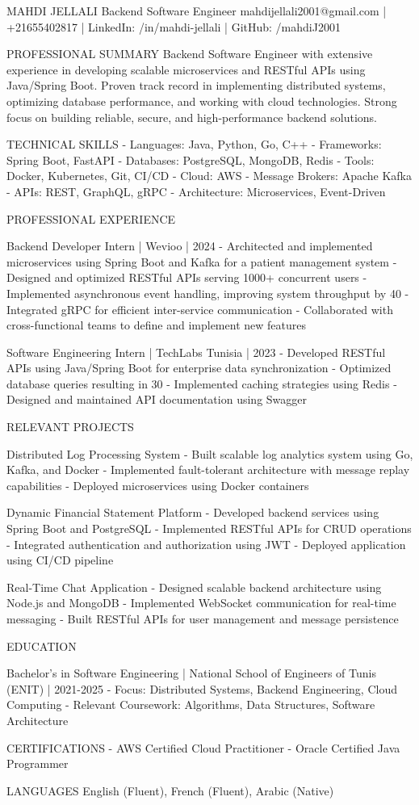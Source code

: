 MAHDI JELLALI
Backend Software Engineer
mahdijellali2001@gmail.com | +21655402817 | LinkedIn: /in/mahdi-jellali | GitHub: /mahdiJ2001

PROFESSIONAL SUMMARY
Backend Software Engineer with extensive experience in developing scalable microservices and RESTful APIs using Java/Spring Boot. Proven track record in implementing distributed systems, optimizing database performance, and working with cloud technologies. Strong focus on building reliable, secure, and high-performance backend solutions.

TECHNICAL SKILLS
- Languages: Java, Python, Go, C++
- Frameworks: Spring Boot, FastAPI
- Databases: PostgreSQL, MongoDB, Redis
- Tools: Docker, Kubernetes, Git, CI/CD
- Cloud: AWS
- Message Brokers: Apache Kafka
- APIs: REST, GraphQL, gRPC
- Architecture: Microservices, Event-Driven

PROFESSIONAL EXPERIENCE

Backend Developer Intern | Wevioo | 2024
- Architected and implemented microservices using Spring Boot and Kafka for a patient management system
- Designed and optimized RESTful APIs serving 1000+ concurrent users
- Implemented asynchronous event handling, improving system throughput by 40%
- Integrated gRPC for efficient inter-service communication
- Collaborated with cross-functional teams to define and implement new features

Software Engineering Intern | TechLabs Tunisia | 2023
- Developed RESTful APIs using Java/Spring Boot for enterprise data synchronization
- Optimized database queries resulting in 30%
- Implemented caching strategies using Redis
- Designed and maintained API documentation using Swagger

RELEVANT PROJECTS

Distributed Log Processing System
- Built scalable log analytics system using Go, Kafka, and Docker
- Implemented fault-tolerant architecture with message replay capabilities
- Deployed microservices using Docker containers

Dynamic Financial Statement Platform
- Developed backend services using Spring Boot and PostgreSQL
- Implemented RESTful APIs for CRUD operations
- Integrated authentication and authorization using JWT
- Deployed application using CI/CD pipeline

Real-Time Chat Application
- Designed scalable backend architecture using Node.js and MongoDB
- Implemented WebSocket communication for real-time messaging
- Built RESTful APIs for user management and message persistence

EDUCATION

Bachelor's in Software Engineering | National School of Engineers of Tunis (ENIT) | 2021-2025
- Focus: Distributed Systems, Backend Engineering, Cloud Computing
- Relevant Coursework: Algorithms, Data Structures, Software Architecture

CERTIFICATIONS
- AWS Certified Cloud Practitioner
- Oracle Certified Java Programmer

LANGUAGES
English (Fluent), French (Fluent), Arabic (Native)